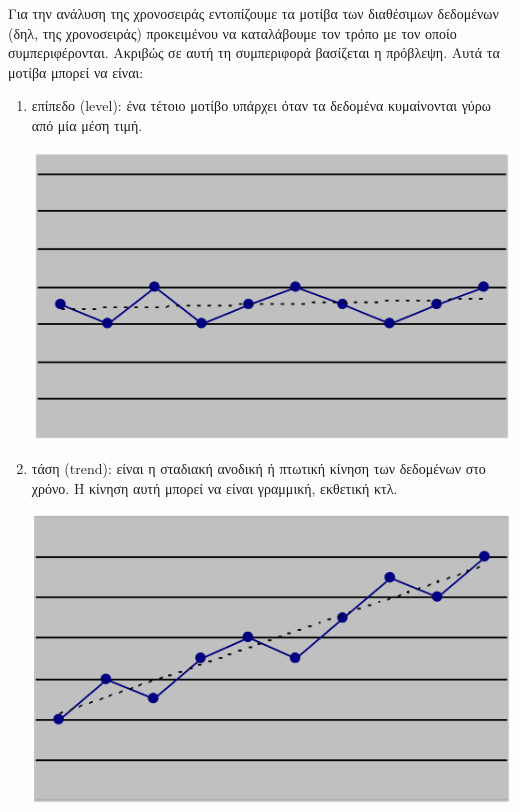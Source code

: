 Για την ανάλυση της χρονοσειράς εντοπίζουμε τα μοτίβα των διαθέσιμων δεδομένων
(δηλ, της χρονοσειράς) προκειμένου να καταλάβουμε τον τρόπο με τον οποίο
συμπεριφέρονται. Ακριβώς σε αυτή τη συμπεριφορά βασίζεται η πρόβλεψη. Αυτά τα
μοτίβα μπορεί να είναι:\\
\begin{enumerate}
\item επίπεδο (level): ένα τέτοιο μοτίβο υπάρχει όταν τα δεδομένα κυμαίνονται
γύρω από μία μέση τιμή.\\
\begin{center}
\includegraphics[scale=0.2]{level.png}\\
\end{center}
\item τάση (trend): είναι η σταδιακή ανοδική ή πτωτική κίνηση των δεδομένων στο
χρόνο. Η κίνηση αυτή μπορεί να είναι γραμμική, εκθετική κτλ.\\
\begin{center}
\includegraphics[scale=0.2]{trend.png}
\end{center}

\end{enumerate}
